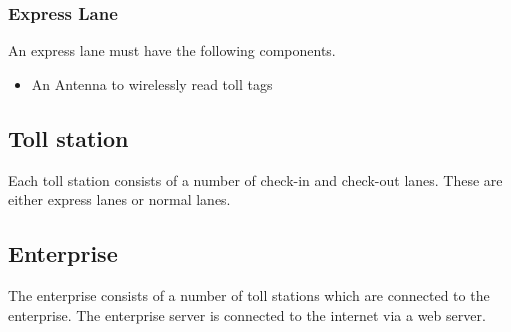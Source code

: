 \subsubsection*{Express Lane}
An express lane must have the following components.

\begin{itemize}
\item An Antenna to wirelessly read toll tags
\end{itemize}

\subsection{Toll station}
Each toll station consists of a number of check-in and check-out lanes. These are either express lanes or normal lanes.

\subsection{Enterprise}
The enterprise consists of a number of toll stations which are connected to the enterprise. The enterprise server is connected to the internet via a web server.

